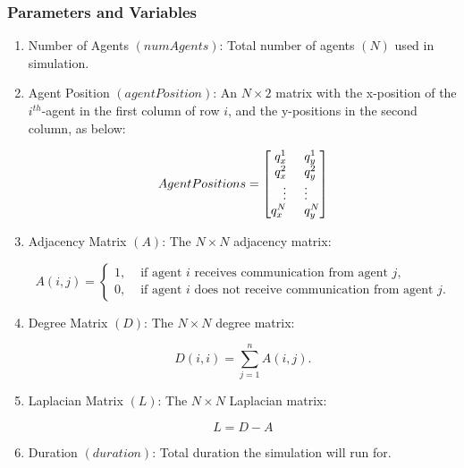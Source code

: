 \documentclass[../CourseManual.tex]{subfiles}
\begin{document}
\subsubsection{Parameters and Variables}

\renewcommand{\labelenumi}{\roman{enumi}}
\begin{enumerate}

    \item Number of Agents $(numAgents)$: Total number of agents $(N)$ used in simulation.
  
    \item Agent Position $(agentPosition)$: An $N \times 2$ matrix with the x-position of the $i^{th}$-agent in the first column of row $i$, and the y-positions in the second column, as below:
  
    $$Agent Positions = 
    \begin{bmatrix}
    q^{1}_{x} \hspace{0.5cm} q^{1}_{y}\\
    q^{2}_{x} \hspace{0.5cm} q^{2}_{y}\\
    \vdots \hspace{0.5cm} \vdots \\
    q^{N}_{x} \hspace{0.5cm} q^{N}_{y}\\
    \end{bmatrix}$$
    
    \item Adjacency Matrix $(A)$: The $N \times N$ adjacency matrix:
    
    $$ 
    A(i,j) = 
    \begin{cases}
     1, & \text{ if agent $i$ receives communication from agent $j$,}\\
     0, & \text{ if agent $i$ does not receive communication from agent $j$.}
    \end{cases}
    $$
    
    \item Degree Matrix $(D)$: The $N \times N$ degree matrix:
    
    \[
    D(i,i) = \sum_{j=1}^{n}{A(i,j)}.
    \]
    
    \item Laplacian Matrix $(L)$: The $N \times N$ Laplacian matrix:
    
    $$L = D - A$$
    
    \item Duration $(duration)$: Total duration the simulation will run for.
    

\end{enumerate}
\end{document}

